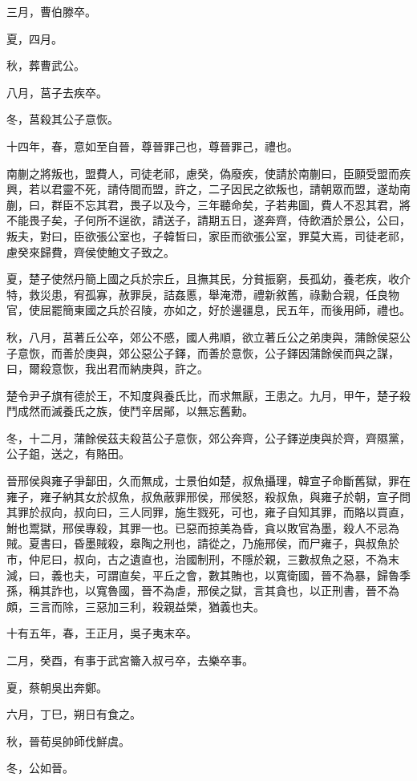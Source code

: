 \begin{pinyinscope}
三月，曹伯滕卒。

夏，四月。

秋，葬曹武公。

八月，莒子去疾卒。

冬，莒殺其公子意恢。

十四年，春，意如至自晉，尊晉罪己也，尊晉罪己，禮也。

南蒯之將叛也，盟費人，司徒老祁，慮癸，偽廢疾，使請於南蒯曰，臣願受盟而疾興，若以君靈不死，請侍間而盟，許之，二子因民之欲叛也，請朝眾而盟，遂劫南蒯，曰，群臣不忘其君，畏子以及今，三年聽命矣，子若弗圖，費人不忍其君，將不能畏子矣，子何所不逞欲，請送子，請期五日，遂奔齊，侍飲酒於景公，公曰，叛夫，對曰，臣欲張公室也，子韓皙曰，家臣而欲張公室，罪莫大焉，司徒老祁，慮癸來歸費，齊侯使鮑文子致之。

夏，楚子使然丹簡上國之兵於宗丘，且撫其民，分貧振窮，長孤幼，養老疾，收介特，救災患，宥孤寡，赦罪戾，詰姦慝，舉淹滯，禮新敘舊，祿勳合親，任良物官，使屈罷簡東國之兵於召陵，亦如之，好於邊疆息，民五年，而後用師，禮也。

秋，八月，莒著丘公卒，郊公不慼，國人弗順，欲立著丘公之弟庚與，蒲餘侯惡公子意恢，而善於庚與，郊公惡公子鐸，而善於意恢，公子鐸因蒲餘侯而與之謀，曰，爾殺意恢，我出君而納庚與，許之。

楚令尹子旗有德於王，不知度與養氏比，而求無厭，王患之。九月，甲午，楚子殺鬥成然而滅養氏之族，使鬥辛居鄖，以無忘舊勳。

冬，十二月，蒲餘侯茲夫殺莒公子意恢，郊公奔齊，公子鐸逆庚與於齊，齊隰黨，公子鉏，送之，有賂田。

晉邢侯與雍子爭鄐田，久而無成，士景伯如楚，叔魚攝理，韓宣子命斷舊獄，罪在雍子，雍子納其女於叔魚，叔魚蔽罪邢侯，邢侯怒，殺叔魚，與雍子於朝，宣子問其罪於叔向，叔向曰，三人同罪，施生戮死，可也，雍子自知其罪，而賂以買直，鮒也鬻獄，邢侯專殺，其罪一也。已惡而掠美為昏，貪以敗官為墨，殺人不忌為賊。夏書曰，昏墨賊殺，皋陶之刑也，請從之，乃施邢侯，而尸雍子，與叔魚於市，仲尼曰，叔向，古之遺直也，治國制刑，不隱於親，三數叔魚之惡，不為末減，曰，義也夫，可謂直矣，平丘之會，數其賄也，以寬衛國，晉不為暴，歸魯季孫，稱其詐也，以寬魯國，晉不為虐，邢侯之獄，言其貪也，以正刑書，晉不為頗，三言而除，三惡加三利，殺親益榮，猶義也夫。

十有五年，春，王正月，吳子夷末卒。

二月，癸酉，有事于武宮籥入叔弓卒，去樂卒事。

夏，蔡朝吳出奔鄭。

六月，丁巳，朔日有食之。

秋，晉荀吳帥師伐鮮虞。

冬，公如晉。


\end{pinyinscope}
